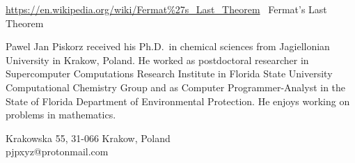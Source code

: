 \documentclass{article}
\begin{document}
\begin{thebibliography}{2}



 \url{https://en.wikipedia.org/wiki/Fermat%27s_Last_Theorem} \ Fermat's Last Theorem




\end{thebibliography}

\begin{biog}
\item[Pawel Jan Piskorz] received his Ph.D.~in chemical sciences from Jagiellonian University in Krakow, Poland. 
He worked as postdoctoral researcher in Supercomputer Computations Research Institute in Florida State University
Computational Chemistry Group and as Computer Programmer-Analyst in the State of Florida Department
of Environmental Protection. He enjoys working on problems in mathematics.
\begin{affil}
Krakowska 55, 31-066 Krakow, Poland\\
pjpxyz@protonmail.com
\end{affil}
\end{biog}
\vfill\eject
\end{document}
